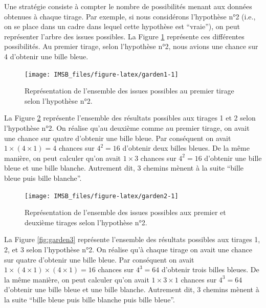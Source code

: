 \documentclass[
  a4paper,11pt,twoside,onecolumn,openright,final,oldfontcommands]{memoir}
\theoremstyle{definition}
\theoremstyle{definition}
\theoremstyle{definition}
\theoremstyle{definition}
\theoremstyle{remark}
\begin{document}
Une stratégie consiste à compter le nombre de possibilités menant aux données obtenues à chaque tirage. Par exemple, si nous considérons l'hypothèse n°2 (i.e., on se place dans un cadre dans lequel cette hypothèse est ``vraie''), on peut représenter l'arbre des issues possibles. La Figure \ref{fig:garden1} représente ces différentes possibilités. Au premier tirage, selon l'hypothèse n°2, nous avions une chance sur 4 d'obtenir une bille bleue.

\begin{figure}[!htb]

{\centering \texttt{[image: IMSB\_files/figure-latex/garden1-1]} 

}

\caption{Représentation de l'ensemble des issues possibles au premier tirage selon l'hypothèse n°2.}\label{fig:garden1}
\end{figure}

La Figure \ref{fig:garden2} représente l'ensemble des résultats possibles aux tirages 1 et 2 selon l'hypothèse n°2. On réalise qu'au deuxième comme au premier tirage, on avait une chance sur quatre d'obtenir une bille bleue. Par conséquent on avait \(1 \times (4 \times 1) = 4\) chances sur \(4^2 = 16\) d'obtenir deux billes bleues. De la même manière, on peut calculer qu'on avait \(1 \times 3\) chances sur \(4^2 = 16\) d'obtenir une bille bleue et une bille blanche. Autrement dit, 3 chemins mènent à la suite ``bille bleue puis bille blanche''.

\begin{figure}[!htb]

{\centering \texttt{[image: IMSB\_files/figure-latex/garden2-1]} 

}

\caption{Représentation de l'ensemble des issues possibles aux premier et deuxième tirages selon l'hypothèse n°2.}\label{fig:garden2}
\end{figure}

La Figure \ref{fig:garden3} représente l'ensemble des résultats possibles aux tirages 1, 2, et 3 selon l'hypothèse n°2. On réalise qu'à chaque tirage on avait une chance sur quatre d'obtenir une bille bleue. Par conséquent on avait \(1 \times (4 \times 1) \times (4 \times 1) = 16\) chances sur \(4^3 = 64\) d'obtenir trois billes bleues. De la même manière, on peut calculer qu'on avait \(1 \times 3 \times 1\) chances sur \(4^3 = 64\) d'obtenir une bille bleue et une bille blanche. Autrement dit, 3 chemins mènent à la suite ``bille bleue puis bille blanche puis bille bleue''.
\end{document}
